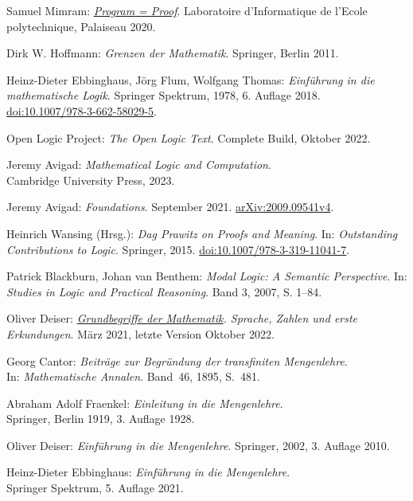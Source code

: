 \begin{thebibliography}{00}
Samuel Mimram:
\emph{\href{https://www.lix.polytechnique.fr/Labo/Samuel.Mimram/publications/}%
{Program = Proof}}.
Laboratoire d'Informatique de l'Ecole polytechnique, Palaiseau 2020.

Dirk W. Hoffmann: \emph{Grenzen der Mathematik}.
Springer, Berlin 2011.

Heinz-Dieter Ebbinghaus, Jörg Flum, Wolfgang Thomas:
\emph{Einführung in die mathematische Logik}.
Springer Spektrum, 1978, 6. Auflage 2018.\\
\href{https://doi.org/10.1007/978-3-662-58029-5}%
{doi:10.1007/978-3-662-58029-5}.

 Open Logic Project:
\emph{The Open Logic Text}. Complete Build, Oktober 2022.

 Jeremy Avigad:
\emph{Mathematical Logic and Computation}.\\
Cambridge University Press, 2023.

 Jeremy Avigad: \emph{Foundations}.
September 2021. \href{https://arxiv.org/abs/2009.09541v4}{arXiv:2009.09541v4}.

 Heinrich Wansing (Hrsg.):
\emph{Dag Prawitz on Proofs and Meaning}.
In: \emph{Outstanding Contributions to Logic}. Springer, 2015.
\href{https://doi.org/10.1007/978-3-319-11041-7}{doi:10.1007/978-3-319-11041-7}.

 Patrick Blackburn, Johan van Benthem:
\emph{Modal Logic: A Semantic Perspective}.
In: \emph{Studies in Logic and Practical Reasoning}.
Band 3, 2007, S. 1--84.

Oliver Deiser:
\emph{\href{https://www.aleph1.info/?call=Puc&permalink=grundbegriffe}%
{Grundbegriffe der Mathematik}. Sprache, Zahlen und erste
Erkundungen}. März 2021, letzte Version Oktober 2022.

 Georg Cantor:
\emph{Beiträge zur Begründung der transfiniten Mengenlehre}.\\
In: \emph{Mathematische Annalen}. Band~46, 1895, S.~481.

 Abraham Adolf Fraenkel:
\emph{Einleitung in die Mengenlehre}.\\
Springer, Berlin 1919, 3. Auflage 1928.

 Oliver Deiser:
\emph{Einführung in die Mengenlehre}.
Springer, 2002, 3. Auflage 2010.

 Heinz-Dieter Ebbinghaus:
\emph{Einführung in die Mengenlehre}.\\
Springer Spektrum, 5. Auflage 2021.


\end{thebibliography}
